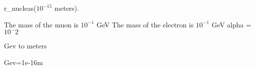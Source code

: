 r_nucleas($10^{-15}$ meters). 

The mass of the muon is $10^{-1}$ GeV
The mass of the electron is $10^{-1}$ GeV
alpha = $10^-2$

Gev to meters

Gev=1e-16m
